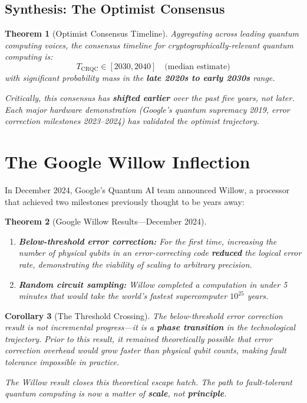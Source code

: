 \documentclass[11pt,a4paper]{article}
\newtheorem{theorem}{Theorem}[section]
\newtheorem{corollary}[theorem]{Corollary}
\begin{document}
\subsection{Synthesis: The Optimist Consensus}

\begin{theorem}[Optimist Consensus Timeline]
Aggregating across leading quantum computing voices, the consensus timeline for cryptographically-relevant quantum computing is:
\begin{equation}
T_{\text{CRQC}} \in [2030, 2040] \quad \text{(median estimate)}
\end{equation}
with significant probability mass in the \textbf{late 2020s to early 2030s} range.

Critically, this consensus has \textbf{shifted earlier} over the past five years, not later. Each major hardware demonstration (Google's quantum supremacy 2019, error correction milestones 2023--2024) has validated the optimist trajectory.
\end{theorem}

\section{The Google Willow Inflection}

In December 2024, Google's Quantum AI team announced Willow, a processor that achieved two milestones previously thought to be years away:

\begin{theorem}[Google Willow Results---December 2024]
\begin{enumerate}[noitemsep]
    \item \textbf{Below-threshold error correction:} For the first time, increasing the number of physical qubits in an error-correcting code \textbf{reduced} the logical error rate, demonstrating the viability of scaling to arbitrary precision.
    \item \textbf{Random circuit sampling:} Willow completed a computation in under 5 minutes that would take the world's fastest supercomputer $10^{25}$ years.
\end{enumerate}
\end{theorem}

\begin{corollary}[The Threshold Crossing]
The below-threshold error correction result is not incremental progress---it is a \textbf{phase transition} in the technological trajectory. Prior to this result, it remained theoretically possible that error correction overhead would grow faster than physical qubit counts, making fault tolerance impossible in practice.

The Willow result closes this theoretical escape hatch. The path to fault-tolerant quantum computing is now a matter of \textbf{scale}, not \textbf{principle}.
\end{corollary}
\end{document}
